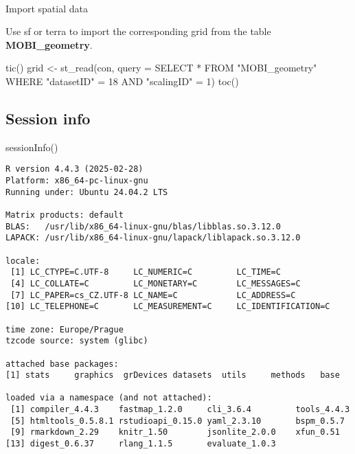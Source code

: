 \documentclass[
  letterpaper,
  DIV=11,
  numbers=noendperiod]{scrartcl}
\makeatletter
\let\oldparagraph\paragraph
\renewcommand{\paragraph}{
    \@ifstar
      \xxxParagraphStar
      \xxxParagraphNoStar
  }
\newcommand{\xxxParagraphStar}[1]{\oldparagraph*{#1}\mbox{}}
\newcommand{\xxxParagraphNoStar}[1]{\oldparagraph{#1}\mbox{}}
\newenvironment{Shaded}{\begin{snugshade}}{\end{snugshade}}
\newcommand{\AttributeTok}[1]{\textcolor[rgb]{0.40,0.45,0.13}{#1}}
\newcommand{\FunctionTok}[1]{\textcolor[rgb]{0.28,0.35,0.67}{#1}}
\newcommand{\NormalTok}[1]{\textcolor[rgb]{0.00,0.23,0.31}{#1}}
\newcommand{\OtherTok}[1]{\textcolor[rgb]{0.00,0.23,0.31}{#1}}
\newcommand{\StringTok}[1]{\textcolor[rgb]{0.13,0.47,0.30}{#1}}
\makeatother
\begin{document}
\paragraph{Import spatial data}\label{import-spatial-data}

Use sf or terra to import the corresponding grid from the table
\textbf{MOBI\_geometry}.

\begin{Shaded}
\begin{Highlighting}[]
\FunctionTok{tic}\NormalTok{()}
\NormalTok{grid }\OtherTok{\textless{}{-}} \FunctionTok{st\_read}\NormalTok{(con, }\AttributeTok{query =} \StringTok{\textquotesingle{}SELECT * FROM "MOBI\_geometry"}
\StringTok{                WHERE "datasetID" = 18}
\StringTok{                AND "scalingID" = 1\textquotesingle{}}\NormalTok{)}
\FunctionTok{toc}\NormalTok{()}
\end{Highlighting}
\end{Shaded}

\subsection{Session info}\label{session-info}

\begin{Shaded}
\begin{Highlighting}[]
\FunctionTok{sessionInfo}\NormalTok{()}
\end{Highlighting}
\end{Shaded}

\begin{verbatim}
R version 4.4.3 (2025-02-28)
Platform: x86_64-pc-linux-gnu
Running under: Ubuntu 24.04.2 LTS

Matrix products: default
BLAS:   /usr/lib/x86_64-linux-gnu/blas/libblas.so.3.12.0 
LAPACK: /usr/lib/x86_64-linux-gnu/lapack/liblapack.so.3.12.0

locale:
 [1] LC_CTYPE=C.UTF-8     LC_NUMERIC=C         LC_TIME=C           
 [4] LC_COLLATE=C         LC_MONETARY=C        LC_MESSAGES=C       
 [7] LC_PAPER=cs_CZ.UTF-8 LC_NAME=C            LC_ADDRESS=C        
[10] LC_TELEPHONE=C       LC_MEASUREMENT=C     LC_IDENTIFICATION=C 

time zone: Europe/Prague
tzcode source: system (glibc)

attached base packages:
[1] stats     graphics  grDevices datasets  utils     methods   base     

loaded via a namespace (and not attached):
 [1] compiler_4.4.3    fastmap_1.2.0     cli_3.6.4         tools_4.4.3      
 [5] htmltools_0.5.8.1 rstudioapi_0.15.0 yaml_2.3.10       bspm_0.5.7       
 [9] rmarkdown_2.29    knitr_1.50        jsonlite_2.0.0    xfun_0.51        
[13] digest_0.6.37     rlang_1.1.5       evaluate_1.0.3   
\end{verbatim}
\end{document}
